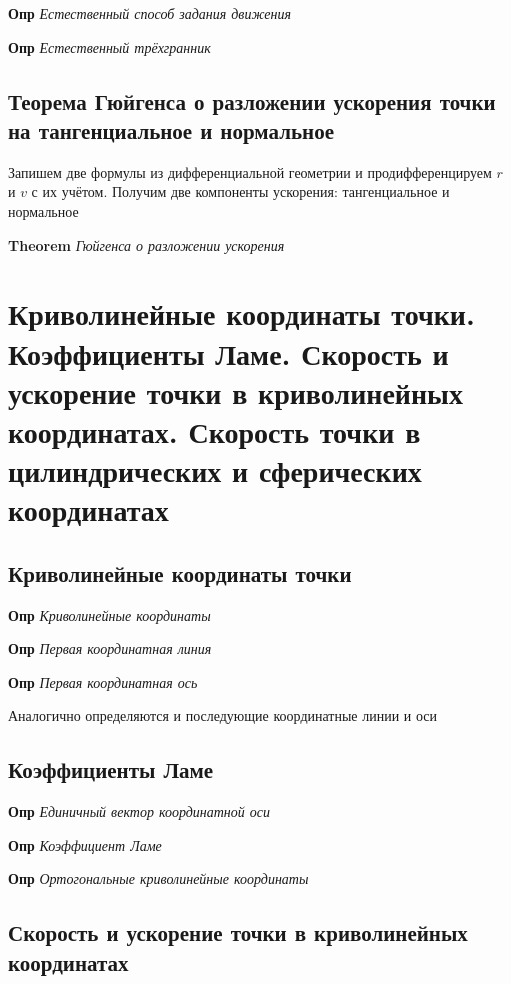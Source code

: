 \documentclass[a4paper, 14pt]{article}
\begin{document}
    \textbf{Опр} \textit{Естественный способ задания движения}
    
    \textbf{Опр} \textit{Естественный трёхгранник}
    
    \subsection{Теорема Гюйгенса о разложении ускорения точки на тангенциальное и нормальное}
    
    Запишем две формулы из дифференциальной геометрии и продифференцируем $r$ и $v$ с их учётом.
    Получим две компоненты ускорения: тангенциальное и нормальное
    
    \textbf{Theorem} \textit{Гюйгенса о разложении ускорения}
    
    \section{Криволинейные координаты точки.
    Коэффициенты Ламе.
    Скорость и ускорение точки в криволинейных координатах.
    Скорость точки в цилиндрических и сферических координатах}
    
    \subsection{Криволинейные координаты точки}
    
    \textbf{Опр} \textit{Криволинейные координаты}
    
    \textbf{Опр} \textit{Первая координатная линия}
    
    \textbf{Опр} \textit{Первая координатная ось}
    
    Аналогично определяются и последующие координатные линии и оси
    
    \subsection{Коэффициенты Ламе}
    
    \textbf{Опр} \textit{Единичный вектор координатной оси}
    
    \textbf{Опр} \textit{Коэффициент Ламе}
    
    \textbf{Опр} \textit{Ортогональные криволинейные координаты}
    
    \subsection{Скорость и ускорение точки в криволинейных координатах}
    
\end{document}
